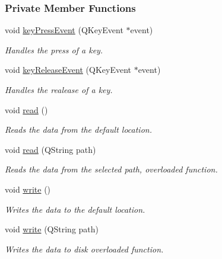 \subsubsection*{Private Member Functions}
\begin{DoxyCompactItemize}
\item 
void \hyperlink{a00005_a9c4f542263838b9ecd06eae839a42a34}{key\+Press\+Event} (Q\+Key\+Event $\ast$event)
\begin{DoxyCompactList}\small\item\em Handles the press of a key. \end{DoxyCompactList}\item 
void \hyperlink{a00005_a6a706e2f733f701fe87e82e77294a035}{key\+Release\+Event} (Q\+Key\+Event $\ast$event)
\begin{DoxyCompactList}\small\item\em Handles the realease of a key. \end{DoxyCompactList}\item 
void \hyperlink{a00005_a38fedeca39a4222060bec372245169cc}{read} ()
\begin{DoxyCompactList}\small\item\em Reads the data from the default location. \end{DoxyCompactList}\item 
void \hyperlink{a00005_a1d72fb0103b6ac7cff959bc389e2c054}{read} (Q\+String path)
\begin{DoxyCompactList}\small\item\em Reads the data from the selected path, overloaded function. \end{DoxyCompactList}\item 
void \hyperlink{a00005_a6fd62e117414acda4fe6a93c453dfb93}{write} ()
\begin{DoxyCompactList}\small\item\em Writes the data to the default location. \end{DoxyCompactList}\item 
void \hyperlink{a00005_aa1362f75c2c485c0094c564256182641}{write} (Q\+String path)
\begin{DoxyCompactList}\small\item\em Writes the data to disk overloaded function. \end{DoxyCompactList}\end{DoxyCompactItemize}
